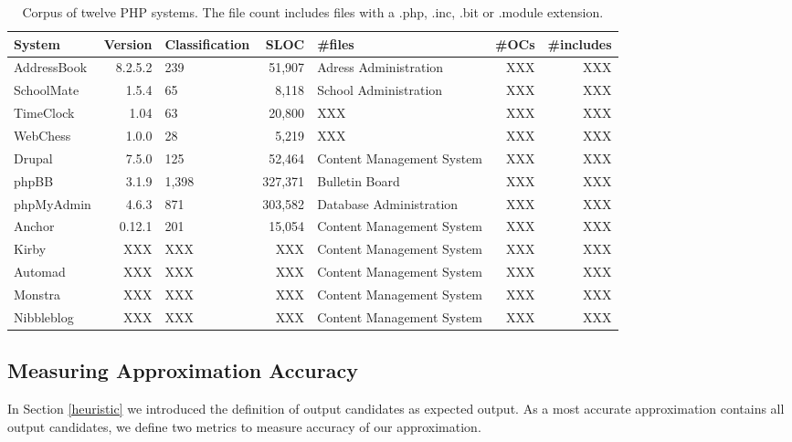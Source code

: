 \documentclass[preprint]{sig-alternate-05-2015}
\begin{document}
\begin{table}[t]
\centering 
	\begin{tabular}{lrp{4cm}rlrr}
	\toprule
	\textbf{System} & \textbf{Version} & \textbf{Classification} & \textbf{SLOC} & \textbf{\#files} & \textbf{\#OCs} & \textbf{\#includes}
	\\
	\midrule
	AddressBook & 8.2.5.2 & 239 & 51,907 & Adress Administration  & XXX & XXX\\
	SchoolMate & 1.5.4 & 65 & 8,118 & School Administration  & XXX & XXX\\
	TimeClock & 1.04 & 63 & 20,800 & XXX  & XXX & XXX\\
	WebChess & 1.0.0 & 28 & 5,219 & XXX  & XXX & XXX\\
	\midrule
	Drupal & 7.5.0 & 125 & 52,464 & Content Management System  & XXX & XXX\\
	phpBB & 3.1.9 & 1,398 & 327,371 & Bulletin Board  & XXX & XXX\\
	phpMyAdmin & 4.6.3 & 871 & 303,582 & Database Administration  & XXX & XXX\\
	\midrule
	Anchor & 0.12.1 & 201 & 15,054 & Content Management System  & XXX & XXX\\
	Kirby & XXX & XXX & XXX & Content Management System  & XXX & XXX\\
	Automad & XXX & XXX & XXX & Content Management System  & XXX & XXX\\
	Monstra & XXX & XXX & XXX & Content Management System  & XXX & XXX\\
	Nibbleblog & XXX & XXX & XXX & Content Management System  & XXX & XXX\\
	\bottomrule
	\end{tabular}
	\caption{Corpus of twelve PHP systems. The file count includes files with a .php,
	.inc, .bit or .module extension.}
	\label{corpus}
\end{table}


\subsection{Measuring Approximation Accuracy}
\label{HowAccurateIsOurApproximation} 
In Section \ref{heuristic} we introduced the definition of output candidates as expected output. As a most accurate approximation contains all output candidates, we define two metrics to measure accuracy of our approximation. 
\end{document}
